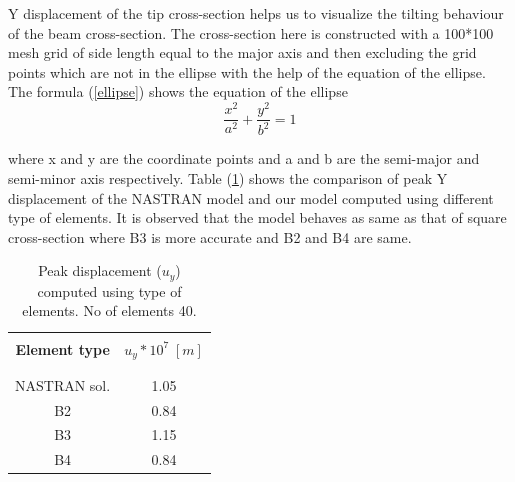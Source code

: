 \documentclass[a4paper,12pt]{article}
\begin{document}
Y displacement of the tip cross-section helps us to visualize the tilting behaviour of the beam cross-section. The cross-section here is constructed with a 100*100 mesh grid of side length equal to the major axis and then excluding the grid points which are not in the ellipse with the help of the equation of the ellipse. The formula (\ref{ellipse}) shows the equation of the ellipse
\\
\begin{equation}
\frac{x^{2}}{a^{2}} + \frac{y^{2}}{b^{2}} = 1
\label{ellipse}
\end{equation}

where x and y are the coordinate points and a and b are the semi-major and semi-minor axis respectively. Table (\ref{tab:table 10})  shows the comparison of peak Y displacement of the NASTRAN model and our model computed using different type of elements. It is observed that the model behaves as same as that of square cross-section where B3 is more accurate and B2 and B4 are same.
\\
\begin{table}[h!]
  \begin{center}
     \begin{tabular}{c c}
      \hline\\
      \textbf{Element type} & \textbf{$u_{y}*10^{7}\;[m]$} \\
      \\
      \hline
      \\[-2pt]
       NASTRAN sol. & 1.05 \\[5pt]
       B2 & 0.84\\[5pt]
       B3 & 1.15 \\[5pt]
       B4 & 0.84 \\[5pt]

      \hline
     \end{tabular}
    \caption{Peak displacement ($u_{y}$) computed  using type of elements. No of elements 40.}
    \label{tab:table 10}
  \end{center}
\end{table}
\end{document}
